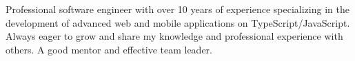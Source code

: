 


\begin{cvparagraph}

Professional software engineer with over 10 years of experience specializing in the development of advanced web and mobile applications on TypeScript/JavaScript.
Always eager to grow and share my knowledge and professional experience with others. A good mentor and effective team leader.
\end{cvparagraph}
\vspace{-2mm}

